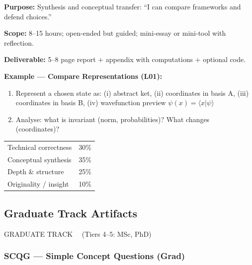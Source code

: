 \documentclass[11pt,a4paper]{article}
\begin{document}
\begin{tcolorbox}[ugprobbox, title={CPJU --- Complex Project, Undergraduate \hfill\normalfont 1 project}]

\textbf{Purpose:} Synthesis and conceptual transfer: ``I can compare frameworks and
defend choices.''

\medskip\textbf{Scope:} 8--15 hours; open-ended but guided; mini-essay or mini-tool
with reflection.

\medskip\textbf{Deliverable:} 5--8 page report + appendix with computations +
optional code.

\medskip\textbf{Example --- Compare Representations (L01):}
\begin{enumerate}[leftmargin=2em,itemsep=2pt]
  \item Represent a chosen state as: (i) abstract ket, (ii) coordinates in basis A,
        (iii) coordinates in basis B, (iv) wavefunction preview $\psi(x)=\langle x|\psi\rangle$
  \item Analyse: what is invariant (norm, probabilities)? What changes (coordinates)?
\end{enumerate}
\end{tcolorbox}

\begin{tcolorbox}[rubricbox, title={CPJU Rubric}]
\begin{tabular}{ll}
  Technical correctness   & 30\%\\
  Conceptual synthesis    & 35\%\\
  Depth \& structure      & 25\%\\
  Originality / insight   & 10\%\\
\end{tabular}
\end{tcolorbox}

\newpage
\subsection{Graduate Track Artifacts}
\label{sec:grad-artifacts}

\begin{tcolorbox}[trackheaderGRAD]
GRADUATE TRACK \ \ (Tiers 4--5: MSc, PhD)
\end{tcolorbox}

\bigskip

\subsubsection{SCQG --- Simple Concept Questions (Grad)}
\end{document}
